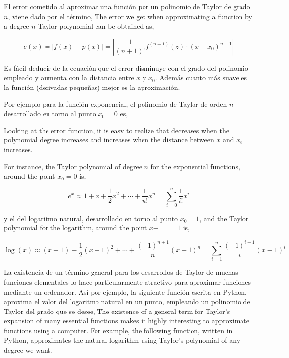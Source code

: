 \begin{paracol}{2}
El error cometido al aproximar una función por un polinomio de Taylor de grado $n$, viene dado por el término,
\switchcolumn
The error we get when approximating a function by a degree $n$ Taylor polynomial can be obtained as, 
\end{paracol}
\begin{equation*}
e(x)=\lvert f(x) -p(x)\rvert=\left\lvert\frac{1}{(n+1)!} f^{(n+1)}(z)\cdot (x-x_0)^{n+1}\right\rvert
\end{equation*}
\begin{paracol}{2}
Es fácil deducir de la ecuación que el error disminuye con el grado del polinomio empleado y aumenta con la distancia entre $x$ y $x_0$. Además cuanto más suave es la función (derivadas pequeñas) mejor es la aproximación.

Por ejemplo para la función exponencial, el polinomio de Taylor de orden $n$ desarrollado en torno al punto $x_0=0$ es, 

\switchcolumn
Looking at the error function, it is easy to realize that decreases when the polynomial degree increases and increases when the distance between $x$ and $x_0$ increases.

For instance, the Taylor polynomial of degree $n$ for the exponential functions, around the point $x_0=0$ is, 
\end{paracol}
\begin{equation*}
e^x\approx 1+x+\frac{1}{2}x^2+\cdots+\frac{1}{n!}x^n=\sum_{i=0}^n\frac{1}{i!}x^i
\end{equation*}
\begin{paracol}{2}
y el del logaritmo natural, desarrollado en torno al punto $x_0=1$, 
\switchcolumn
and the Taylor polynomial for the logarithm, around the point $x-= =1$ is,  
\end{paracol}
\begin{equation*}
\log(x)\approx (x-1)-\frac{1}{2}(x-1)^2+\cdots+\frac{(-1)^{n+1}}{n}(x-1)^n=\sum_{i=1}^n\frac{(-1)^{i+1}}{i}(x-1)^i
\end{equation*}
\begin{paracol}{2}
La existencia de un término general para los desarrollos de Taylor de muchas funciones elementales lo hace particularmente atractivo para aproximar funciones mediante un ordenador. Así por ejemplo, la siguiente función escrita en Python, aproxima el valor del logaritmo natural en un punto, empleando un polinomio de Taylor del grado que se desee,
\switchcolumn
The existence of a general term for Taylor's expansion of many essential functions makes it highly interesting to approximate functions using a computer. For example, the following function, written in Python, approximates the natural logarithm using Taylor's polynomial of any degree we want.   
\end{paracol}


